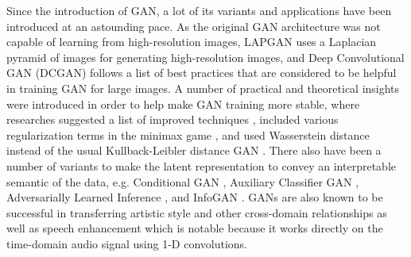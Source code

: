 Since the introduction of GAN, a lot of its variants and applications have been introduced at an astounding pace.
As the original GAN architecture was not capable of learning from high-resolution images, LAPGAN \cite{denton2015lapgan} uses a Laplacian pyramid of images for generating high-resolution images, and Deep Convolutional GAN (DCGAN) \cite{radford2015dcgan} follows a list of best practices that are considered to be helpful in training GAN for large images.
A number of practical and theoretical insights were introduced in order to help make GAN training more stable, where researches suggested a list of improved techniques \cite{salimans2016improved}, included various regularization terms in the minimax game \cite{che2016mrgan, larsen2015vaegan}, and used Wasserstein distance instead of the usual Kullback-Leibler distance GAN \cite{arjovsky2017wgan,berthelot2017began}.
There also have been a number of variants to make the latent representation to convey an interpretable semantic of the data, e.g. Conditional GAN \cite{mirza2014conditional}, Auxiliary Classifier GAN \cite{odena2016acgan}, Adversarially Learned Inference \cite{dumoulin2017ali}, and InfoGAN \cite{chen2016infogan}.
GANs are also known to be successful in transferring artistic style \cite{zhu2017cyclegan} and other cross-domain relationships \cite{kim2017discogan} as well as speech enhancement \cite{pascual2017segan} which is notable because it works directly on the time-domain audio signal using 1-D convolutions.




